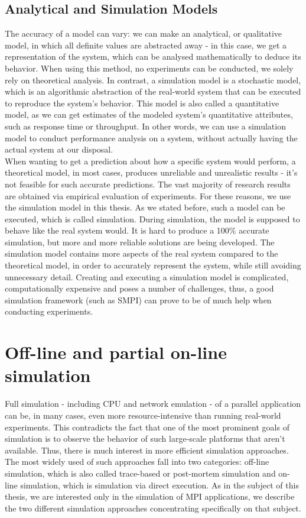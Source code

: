\subsection{Analytical and Simulation Models}
The accuracy of a model can vary: we can make an analytical, or
qualitative model, in which all definite values are abstracted away -
in this case, we get a representation of
the system, which can be analysed mathematically to deduce its
behavior. When using this method, no experiments can be conducted, we
solely rely on theoretical analysis. In contrast, a simulation model
is a stochastic model, which is an algorithmic abstraction of the
real-world system that can be executed to reproduce the system's
behavior. This model is also called a quantitative model, as we can
get estimates of the modeled system's quantitative attributes, such as
response time or throughput. In other words, we can use a simulation
model to conduct performance analysis on a system, without actually
having the actual system at our disposal.\cite{h12_1}\cite{h12_13}\\[0.3cm]
When wanting to get a prediction about how a specific system would
perform, a theoretical model, in most cases, produces unreliable and
unrealistic results - it's not feasible for such accurate
predictions. The vast majority of research results are obtained via
empirical evaluation of experiments.\cite{clq08} For these reasons, we
use the simulation model in this thesis. As we stated before, such a
model can be executed, which is called simulation. During simulation,
the model is supposed to behave like the real system would. It is hard
to produce a 100\% accurate simulation, but more and more reliable
solutions are being developed. The simulation model contains
more aspects of the real system compared to the theoretical model, in
order to accurately represent the system, while still avoiding
unnecessary detail.\cite{h12_1} Creating and executing a simulation
model is complicated, computationally expensive and poses a number of
challenges, thus, a good simulation framework (such as SMPI) can prove
to be of much help when conducting experiments.
\section{Off-line and partial on-line simulation}
Full simulation - including CPU and network emulation - of a parallel
application can be, in many cases, even more resource-intensive than
running real-world experiments. This contradicts the fact that one of
the most prominent goals of simulation is to observe the behavior of
such large-scale platforms that aren't available. Thus, there is much
interest in more efficient simulation approaches. \cite{bdglmqssv13}
The most widely used of such approaches fall into two categories:
off-line simulation, which is also called trace-based or post-mortem
simulation and on-line simulation, which is simulation via direct
execution.\cite{csgscq11} As in the subject of this thesis, we are
interested only in the simulation of MPI applications, we describe
the two different simulation approaches concentrating specifically on
that subject.
